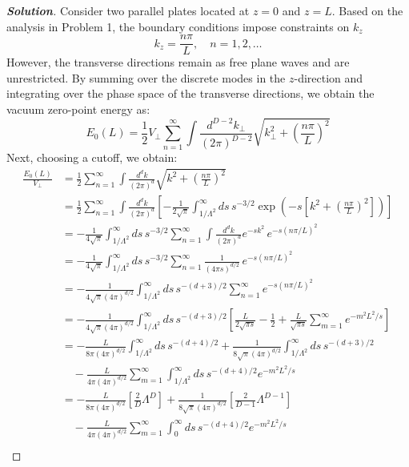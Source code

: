 \documentclass[11pt]{article}
\newenvironment{solution}[1][]{\begin{proof}[\textbf{Solution}]}{\end{proof}}
\begin{document}
\begin{solution}[17.6]
	Consider two parallel plates located at $z=0$ and $z=L$. Based on the analysis in Problem 1, the boundary conditions impose constraints on $k_z$
	\[
	k_z=\frac{n\pi}{L},\quad n=1,2,\ldots
	\]
	However, the transverse directions remain as free plane waves and are unrestricted. By summing over the discrete modes in the $z$-direction and integrating over the phase space of the transverse directions, we obtain the vacuum zero-point energy as:
	\[
	E_0(L)=\frac{1}{2}V_\perp\sum_{n=1}^\infty\int\frac{d^{D-2}k_\perp}{(2\pi)^{D-2}}\sqrt{k_\perp^2+\left(\frac{n\pi}{L}\right)^2}
	\]
	Next, choosing a cutoff, we obtain:
	\begin{align*}
		\frac{E_0(L)}{V_\perp}
		&=\frac12\sum_{n=1}^\infty \int\frac{d^{d}k}{(2\pi)^{d}}
		\sqrt{k^2+\left(\frac{n\pi}{L}\right)^2} \\[4pt]
		&=\frac12\sum_{n=1}^\infty \int\frac{d^{d}k}{(2\pi)^{d}}
		\left[-\frac1{2\sqrt\pi}\int_{1/\Lambda^2}^{\infty}ds\,s^{-3/2}
		\exp\!\left(-s\left[k^2+\left(\frac{n\pi}{L}\right)^2\right]\right)\right] \\[6pt]
		&=-\frac1{4\sqrt\pi}\int_{1/\Lambda^2}^{\infty}ds\,s^{-3/2}
		\sum_{n=1}^\infty \int\frac{d^{d}k}{(2\pi)^{d}}
		e^{-sk^2}\,e^{-s(n\pi/L)^2} \\[6pt]
		&=-\frac1{4\sqrt\pi}\int_{1/\Lambda^2}^{\infty}ds\,s^{-3/2}
		\sum_{n=1}^\infty \frac1{(4\pi s)^{d/2}}\,e^{-s(n\pi/L)^2} \\[6pt]
		&=-\frac1{4\sqrt\pi(4\pi)^{d/2}}
		\int_{1/\Lambda^2}^{\infty}ds\,s^{-(d+3)/2}\sum_{n=1}^\infty e^{-s(n\pi/L)^2} \\[8pt]
		&=-\frac1{4\sqrt\pi(4\pi)^{d/2}}
		\int_{1/\Lambda^2}^{\infty}ds\,s^{-(d+3)/2}
		\left[\frac{L}{2\sqrt{\pi s}}-\frac12+\frac{L}{\sqrt{\pi s}}\sum_{m=1}^{\infty}e^{-m^2L^2/s}\right] \\[10pt]
		&=-\frac{L}{8\pi(4\pi)^{d/2}}\int_{1/\Lambda^2}^{\infty}ds\,s^{-(d+4)/2}
		+\frac{1}{8\sqrt\pi(4\pi)^{d/2}}\int_{1/\Lambda^2}^{\infty}ds\,s^{-(d+3)/2} \\[4pt]
		&\quad-\frac{L}{4\pi(4\pi)^{d/2}}\sum_{m=1}^\infty\int_{1/\Lambda^2}^{\infty}ds\,s^{-(d+4)/2}e^{-m^2L^2/s} \\[10pt]
		&=-\frac{L}{8\pi(4\pi)^{d/2}}\left[\frac{2}{D}\Lambda^{D}\right]
		+\frac{1}{8\sqrt\pi(4\pi)^{d/2}}\left[\frac{2}{D-1}\Lambda^{D-1}\right] \\[4pt]
		&\quad-\frac{L}{4\pi(4\pi)^{d/2}}\sum_{m=1}^\infty\int_{0}^{\infty}ds\,s^{-(d+4)/2}e^{-m^2L^2/s} \\[10pt]

\end{align*}
\end{solution}
\end{document}
